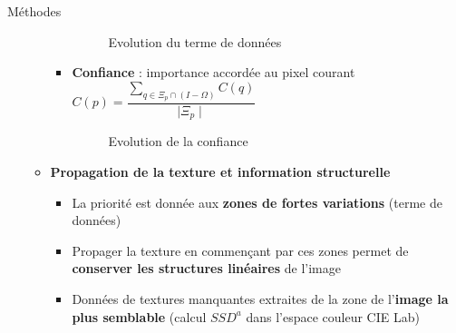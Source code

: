 \documentclass[final,hyperref={pdfpagelabels=false}]{beamer}
\begin{document}
\begin{frame}[t]
\begin{columns}[t]
\begin{column}{.465\textwidth}
\begin{block}{\Large Méthodes}
\begin{itemize}
\begin{itemize}
\begin{itemize}
\begin{figure}[H]
\centering
{}
\caption{Evolution du terme de données}
\end{figure}


\item \textbf{Confiance} : importance accordée au pixel courant $C(p) = \dfrac{\sum_{q\in \Xi_p \cap(I-\Omega)} C(q)}{\mid \Xi_p\mid} $

\begin{figure}[H]
\centering
{}
\caption{Evolution de la confiance}
\end{figure}
\end{itemize}


\item \textbf{Propagation de la texture et information structurelle}
	\begin{itemize}
	\item La priorité est donnée aux \textbf{zones de fortes variations} (terme de données)
	\item Propager la texture en commençant par ces zones permet de \textbf{conserver les structures linéaires} de l'image
	\item Données de textures manquantes extraites de la zone de l'\textbf{image la plus semblable} (calcul $SSD^a$ dans l'espace couleur CIE Lab)
	

\end{itemize}
\end{itemize}
\end{itemize}
\end{block}
\end{column}
\end{columns}
\end{frame}
\end{document}
